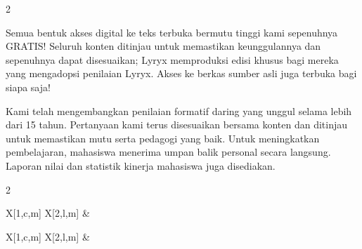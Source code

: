 \begin{center}
\begin{multicols}{2}
\parbox{0.9\linewidth}{
Semua bentuk akses digital ke teks terbuka bermutu tinggi kami sepenuhnya GRATIS! Seluruh konten ditinjau untuk memastikan keunggulannya dan sepenuhnya dapat disesuaikan; Lyryx memproduksi edisi khusus bagi mereka yang mengadopsi penilaian Lyryx. Akses ke berkas sumber asli juga terbuka bagi siapa saja!
}

\columnbreak

\parbox{0.9\linewidth}{
Kami telah mengembangkan penilaian formatif daring yang unggul selama lebih dari 15 tahun. Pertanyaan kami terus disesuaikan bersama konten dan ditinjau untuk memastikan mutu serta pedagogi yang baik. Untuk meningkatkan pembelajaran, mahasiswa menerima umpan balik personal secara langsung. Laporan nilai dan statistik kinerja mahasiswa juga disediakan.
	}
\end{multicols}
\end{center}

\vspace{2em}

\begin{multicols}{2}
\begin{center}
\begin{lscshdrbox}
\begin{tabu}{X[1,c,m] X[2,l,m]}
\vspace{0pt}
&
\vspace{0pt}
\textcolor{white}{\textbf{\fontsize{14}{20}\selectfont {DUKUNGAN}}}
\end{tabu}
\end{lscshdrbox}
\end{center}

\columnbreak

\begin{center}
\begin{lscshdrbox}
\begin{tabu}{X[1,c,m] X[2,l,m]}
\vspace{0pt}
&
\vspace{0pt}
\textcolor{white}{\textbf{\fontsize{14}{20}\selectfont {SUPLEMEN PENGAJAR}}}
\end{tabu}
\end{lscshdrbox}
\end{center}
\end{multicols}

